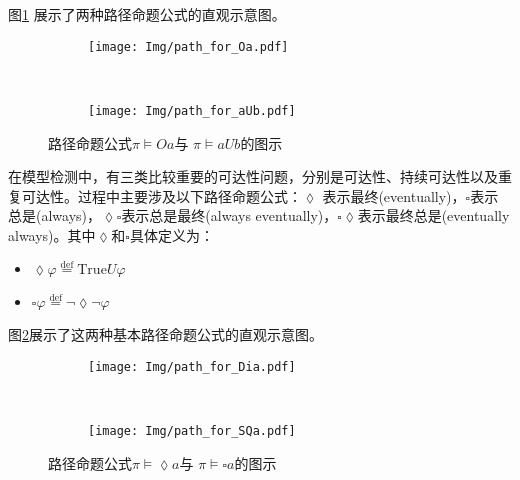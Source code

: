 图\ref{fig:path-formula-basic} 展示了两种路径命题公式的直观示意图。


\begin{figure}[!htbp]
    \centering
    \begin{subfigure}[b]{0.8\textwidth}
        \centering
        \texttt{[image: Img/path\_for\_Oa.pdf]}
    \end{subfigure}
    \\
    \begin{subfigure}{0.8\textwidth}
        \centering
        \texttt{[image: Img/path\_for\_aUb.pdf]}
    \end{subfigure}
    \caption{路径命题公式$\pi\models O a $与 $\pi\models a U b$的图示}
    \label{fig:path-formula-basic}
\end{figure}
在模型检测中，有三类比较重要的可达性问题，分别是可达性、持续可达性以及重复可达性。过程中主要涉及以下路径命题公式：\(\lozenge\) 表示最终(eventually)，\(\square\)表示总是(always)，\(\lozenge\square\)表示总是最终(always eventually)，\(\square\lozenge\)表示最终总是(eventually always)。其中\(\lozenge\)和\(\square\)具体定义为：
\begin{itemize}
    \item \(\lozenge\varphi\overset{\text{def} }{=} \text{True}U\varphi\)
    \item \(\square\varphi\overset{\text{def} }{=} \neg\lozenge\neg\varphi\)
\end{itemize}
图\ref{fig:path-formula}展示了这两种基本路径命题公式的直观示意图。
\begin{figure}[!htbp]
    \centering
    \begin{subfigure}[b]{0.8\textwidth}
        \centering
        \texttt{[image: Img/path\_for\_Dia.pdf]}
    \end{subfigure}
    \\
    \begin{subfigure}{0.8\textwidth}
        \centering
        \texttt{[image: Img/path\_for\_SQa.pdf]}
    \end{subfigure}
    \caption{路径命题公式$\pi\models\lozenge a$与 $\pi\models\square a$的图示}
    \label{fig:path-formula}
\end{figure}

